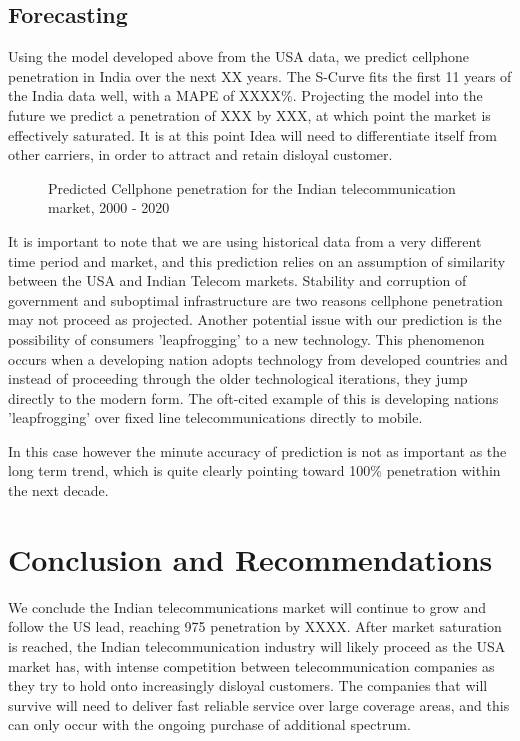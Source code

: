 \documentclass[11pt]{article}
\begin{document}
	\subsection{Forecasting}
		Using the model developed above from the USA data, we predict cellphone penetration in India over the next XX years.
		The S-Curve fits the first 11 years of the India data well, with a MAPE of XXXX\%.
		Projecting the model into the future we predict a penetration of  XXX by XXX, at which point the market is effectively saturated.
		It is at this point Idea will need to differentiate itself from other carriers, in order to attract and retain disloyal customer.

		\begin{figure}[h!]
			\centering
			\caption{Predicted Cellphone penetration for the Indian telecommunication market, 2000 - 2020}
			\label{fig:pred}
		\end{figure}

		It is important to note that we are using historical data from a very different time period and market, and this prediction relies on an assumption of similarity between the USA and Indian Telecom markets. 
		Stability and corruption of government and suboptimal infrastructure are two reasons cellphone penetration may not proceed as projected.
		Another potential issue with our prediction is the possibility of consumers 'leapfrogging' to a new technology.
		This phenomenon occurs when a developing nation adopts technology from developed countries and instead of proceeding through the older technological iterations, they jump directly to the modern form.
		The oft-cited example of this is developing nations 'leapfrogging' over fixed line telecommunications directly to mobile.

		In this case however the minute accuracy of prediction is not as important as the long term trend, which is quite clearly pointing toward 100\% penetration within the next decade.

		\newpage
	\section{Conclusion and Recommendations}
		We conclude the Indian telecommunications market will continue to grow and follow the US lead, reaching 975 penetration by XXXX.
		After market saturation is reached, the Indian telecommunication industry will likely proceed as the USA market has, with intense competition between telecommunication companies as they try to hold onto increasingly disloyal customers.
		The companies that will survive will need to deliver fast reliable service over large coverage areas, and this can only occur with the ongoing purchase of additional spectrum.
\end{document}
